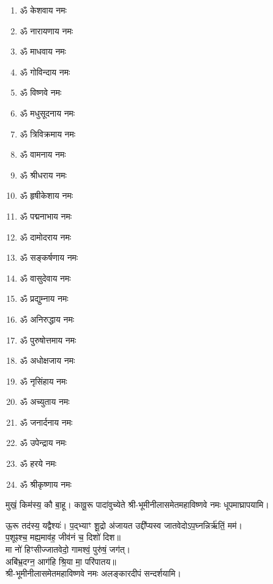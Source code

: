 \begin{center}
\begin{multicols}{2}
\begin{enumerate}
\item ॐ केशवाय नमः
\item ॐ नारायणाय नमः
\item ॐ माधवाय नमः
\item ॐ गोविन्दाय नमः
\item ॐ विष्णवे नमः	
\item ॐ मधुसूदनाय नमः
\item ॐ त्रिविक्रमाय नमः
\item ॐ वामनाय नमः
\item ॐ श्रीधराय नमः
\item ॐ हृषीकेशाय नमः
\item ॐ पद्मनाभाय नमः
\item ॐ दामोदराय नमः
\item ॐ सङ्कर्षणाय नमः
\item ॐ वासुदेवाय नमः
\item ॐ प्रद्युम्नाय नमः
\item ॐ अनिरुद्धाय नमः
\item ॐ पुरुषोत्तमाय नमः
\item ॐ अधोक्षजाय नमः
\item ॐ नृसिंहाय नमः
\item ॐ अच्युताय नमः
\item ॐ जनार्दनाय नमः
\item ॐ उपेन्द्राय नमः
\item ॐ हरये नमः
\item ॐ श्रीकृष्णाय नमः
\end{enumerate}
\end{multicols}
\clearpage

\begingroup
\setlength{\columnseprule}{1pt}
\let\chapt\sect


\endgroup




{मुखं॒ किम॑स्य॒ कौ बा॒हू। कावू॒रू पादा॑वुच्येते}
श्री-भूमीनीलासमेतमहाविष्णवे नमः धूपमाघ्रापयामि।\medskip

{ऊ॒रू तद॑स्य॒ यद्वैश्यः॑। प॒द्भ्याꣳ शू॒द्रो अ॑जायत}
उद्दी᳚प्यस्व जातवेदोऽप॒घ्नन्निर्ऋ॑तिं॒ मम॑।\\
प॒शूꣴश्च॒ मह्य॒माव॑ह॒ जीव॑नं च॒ दिशो॑ दिश॥ \\
मा नो॑ हिꣳसीज्जातवेदो॒ गामश्वं॒ पुरु॑षं॒ जग॑त्।\\
अबि॑भ्र॒दग्न॒ आग॑हि श्रि॒या मा॒ परि॑पातय॥ \\
श्री-भूमीनीलासमेतमहाविष्णवे नमः अलङ्कारदीपं सन्दर्शयामि।\medskip


\end{center}
